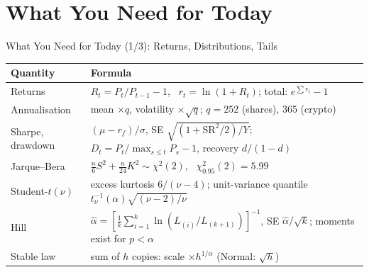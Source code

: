 \section{What You Need for Today}

\begin{frame}{What You Need for Today (1/3): Returns, Distributions, Tails}
\itemsize{\small}
{\renewcommand{\arraystretch}{1.3}\begin{center}
\footnotesize
\begin{tabular}{ll}
\toprule
\textbf{Quantity} & \textbf{Formula} \\
\midrule
Returns & $R_t = P_t/P_{t-1} - 1$, \ $r_t = \ln(1 + R_t)$; total: $e^{\sum r_t} - 1$ \\
Annualisation & mean $\times q$, volatility $\times \sqrt{q}$; $q = 252$ (shares), 365 (crypto) \\
Sharpe, drawdown & $(\mu - r_f)/\sigma$, SE $\sqrt{(1 + \mathrm{SR}^2/2)/Y}$; \ $D_t = P_t/\max_{s \le t}P_s - 1$, recovery $d/(1 - d)$ \\
Jarque--Bera & $\frac{n}{6}S^2 + \frac{n}{24}K^2 \sim \chi^2(2)$, \ $\chi^2_{0.95}(2) = 5.99$ \\
Student-$t(\nu)$ & excess kurtosis $6/(\nu - 4)$; unit-variance quantile $t_\nu^{-1}(\alpha)\sqrt{(\nu - 2)/\nu}$ \\
Hill & $\hat\alpha = [\frac1k\sum_{i=1}^k \ln(L_{(i)}/L_{(k+1)})]^{-1}$, SE $\hat\alpha/\sqrt{k}$; moments exist for $p < \alpha$ \\
Stable law & sum of $h$ copies: scale $\times h^{1/\alpha}$ (Normal: $\sqrt{h}$) \\
\bottomrule
\end{tabular}
\end{center}
}
\end{frame}

